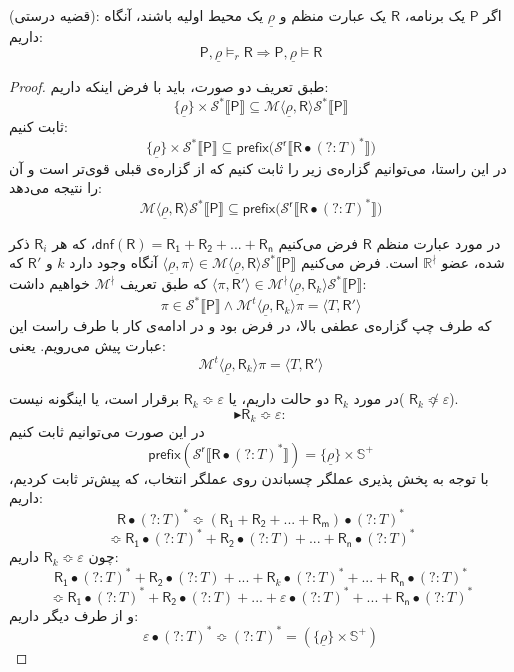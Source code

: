 \begin{thm}
	(قضیه درستی): اگر $\mathsf{P}$ یک برنامه، $\mathsf{R}$ یک عبارت منظم و $\underline{\rho}$ یک محیط اولیه باشند، آنگاه داریم:
	$$\mathsf{P},\underline{\rho} \models_r \mathsf{R} \Rightarrow
	\mathsf{P},\underline{\rho} \models \mathsf{R}$$
\end{thm}
\begin{proof}
	طبق تعریف دو صورت، باید با فرض اینکه داریم:
	$$\{\underline{\rho}\}\times\mathcal{S}^* \llbracket \mathsf{P} \rrbracket \subseteq 
	\mathcal{M}\langle \underline{\rho},\mathsf{R} \rangle \mathcal{S}^* \llbracket \mathsf{P} \rrbracket$$
	ثابت کنیم:
	$$\{\underline{\rho}\}\times\mathcal{S}^* \llbracket \mathsf{P} \rrbracket \subseteq 
	\mathsf{prefix(\mathcal{S}^r \llbracket R \bullet (?:\mathit{T})^*} \rrbracket)$$
	در این راستا، می‌توانیم گزاره‌ی زیر را ثابت کنیم که از گزاره‌ی قبلی قوی‌تر است و آن را نتیجه می‌دهد:
	$$\mathcal{M}\langle \underline{\rho},\mathsf{R} \rangle \mathcal{S}^* \llbracket \mathsf{P} \rrbracket \subseteq \mathsf{prefix(\mathcal{S}^r \llbracket R \bullet (?:\mathit{T})^*} \rrbracket)$$
	
	در مورد عبارت منظم $\mathsf{R}$ فرض می‌کنیم
	$\mathsf{dnf(R)=R_1+R_2+...+R_n}$،
	که هر $\mathsf{R}_i$ ذکر شده، عضو $\mathbb{R}^\nmid$ است. 
	فرض می‌کنیم
	$\langle \underline{\rho}, \pi \rangle \in \mathcal{M}\langle \underline{\rho},\mathsf{R} \rangle \mathcal{S}^* \llbracket \mathsf{P} \rrbracket$
	آنگاه وجود دارد $k$ و $\mathsf{R'}$ که \break
	$\langle \pi , \mathsf{R'} \rangle  \in \mathcal{M}^\nmid\langle \underline{\rho},\mathsf{R}_k \rangle \mathcal{S}^* \llbracket \mathsf{P} \rrbracket$
	که طبق تعریف $\mathcal{M}^\nmid$ خواهیم داشت:
	$$\pi \in \mathcal{S}^* \llbracket \mathsf{P} \rrbracket \land \mathcal{M}^t \langle \underline{\rho},\mathsf{R}_k \rangle \pi = \langle \mathit{T},\mathsf{R'} \rangle$$
	که طرف چپ گزاره‌ی عطفی بالا، در فرض بود و در ادامه‌ی کار با طرف راست این عبارت پیش می‌رویم. یعنی:
	$$\mathcal{M}^t \langle \underline{\rho},\mathsf{R}_k\rangle \pi = \langle \mathit{T},\mathsf{R'} \rangle$$

در مورد $\mathsf{R}_k$ دو حالت داریم، یا 
$\mathsf{R}_k \Bumpeq \varepsilon$
برقرار است، یا اینگونه نیست( 
$\mathsf{R}_k \not\Bumpeq \varepsilon$).
$$\blacktriangleright\mathsf{R}_k \Bumpeq \varepsilon:$$
در این صورت می‌توانیم ثابت کنیم 
$$\mathsf{prefix(\mathcal{S}^r \llbracket \mathsf{R} \bullet (?:\mathit{T})^* \rrbracket)}=
	\{\underline{\rho}\} \times \mathbb{S}^+$$
با توجه به پخش پذیری عملگر چسباندن روی عملگر انتخاب، که پیش‌تر ثابت کردیم، داریم:
$$\mathsf{R}\bullet(?:\mathit{T})^* \Bumpeq \mathsf{(R_1 + R_2 + ... +R_m)}\bullet(?:\mathit{T})^*$$
$$\Bumpeq \mathsf{R_1}\bullet (?:\mathit{T})^* + \mathsf{R_2} \bullet (?:\mathit{T})+...+ \mathsf{R_n} \bullet (?:\mathit{T})^*$$
چون $\mathsf{R}_k \Bumpeq \varepsilon$ داریم:
$$\mathsf{R_1}\bullet (?:\mathit{T})^* + \mathsf{R_2} \bullet (?:\mathit{T})+...+ \mathsf{R}_k \bullet (?:\mathit{T})^* +...+ \mathsf{R_n} \bullet (?:\mathit{T})^*$$
$$\Bumpeq \mathsf{R_1}\bullet (?:\mathit{T})^* + \mathsf{R_2} \bullet (?:\mathit{T})+...+ \varepsilon \bullet (?:\mathit{T})^* +...+ \mathsf{R_n} \bullet (?:\mathit{T})^*$$
و از طرف دیگر داریم:
$$\varepsilon \bullet (?:\mathit{T})^* \Bumpeq (?:\mathit{T})^* = (\{\underline{\rho}\} \times \mathbb{S}^+)$$  


\end{proof}
